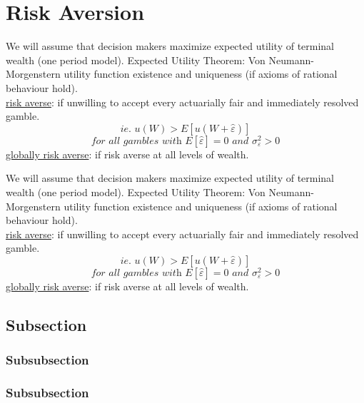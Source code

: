 \documentclass[
14pt,notheorems,hyperref={pdfauthor=whatever}
]{beamer}
\begin{document}
\section{Risk Aversion}
\begin{frame}
We will assume that decision makers maximize expected utility of terminal wealth (one period model). Expected Utility Theorem: Von Neumann-Morgenstern utility function existence and uniqueness (if axioms of rational behaviour hold).\\
\hfill \break
\underline{risk averse}: if unwilling to accept every actuarially fair and immediately resolved gamble.\\
\[\textit{ie. } u(W) > E[u(W+\hat{\varepsilon})]\]
\[\textit{for all gambles with $E[\hat{\varepsilon}]=0$ and $\sigma_\varepsilon^2 >0$}\]
\hfill \break
\underline{globally risk averse}: if risk averse at all levels of wealth.\\
\end{frame}

\begin{frame}
We will assume that decision makers maximize expected utility of terminal wealth (one period model). Expected Utility Theorem: Von Neumann-Morgenstern utility function existence and uniqueness (if axioms of rational behaviour hold).\\
\hfill \break
\underline{risk averse}: if unwilling to accept every actuarially fair and immediately resolved gamble.\\
\[\textit{ie. } u(W) > E[u(W+\hat{\varepsilon})]\]
\[\textit{for all gambles with $E[\hat{\varepsilon}]=0$ and $\sigma_\varepsilon^2 >0$}\]
\underline{globally risk averse}: if risk averse at all levels of wealth.\\
\end{frame}

\subsection{Subsection}
\subsubsection{Subsubsection}
\subsubsection{Subsubsection}
\end{document}
